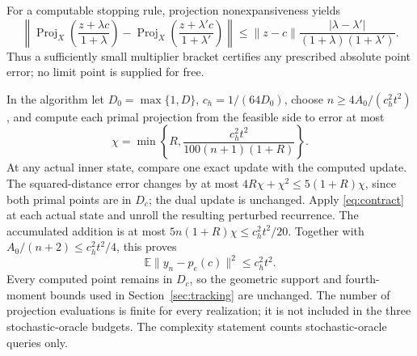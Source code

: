 \documentclass[11pt,a4paper]{article}
\newcommand{\E}{\mathbb E}
\DeclareMathOperator{\Proj}{Proj}
\theoremstyle{remark}
\numberwithin{equation}{section}
\begin{document}
For a computable stopping rule, projection nonexpansiveness yields
\[
 \left\|\Proj_X\left(\frac{z+\lambda c}{1+\lambda}\right)
 -\Proj_X\left(\frac{z+\lambda'c}{1+\lambda'}\right)\right\|
 \le \|z-c\|\frac{|\lambda-\lambda'|}{(1+\lambda)(1+\lambda')}.
\]
Thus a sufficiently small multiplier bracket certifies any prescribed absolute point error; no limit point is supplied for free.

In the algorithm let $D_0=\max\{1,D\}$, $c_h=1/(64D_0)$, choose $n\ge4A_0/(c_h^2t^2)$, and compute each primal projection from the feasible side to error at most
\[
 \chi=\min\left\{R,\frac{c_h^2t^2}{100(n+1)(1+R)}\right\}.
\]
At any actual inner state, compare one exact update with the computed update. The squared-distance error changes by at most $4R\chi+\chi^2\le5(1+R)\chi$, since both primal points are in $D_c$; the dual update is unchanged. Apply \eqref{eq:contract} at each actual state and unroll the resulting perturbed recurrence. The accumulated addition is at most $5n(1+R)\chi\le c_h^2t^2/20$. Together with $A_0/(n+2)\le c_h^2t^2/4$, this proves
\[
 \E\|y_n-p_e(c)\|^2\le c_h^2t^2.
\]
Every computed point remains in $D_c$, so the geometric support and fourth-moment bounds used in Section~\ref{sec:tracking} are unchanged. The number of projection evaluations is finite for every realization; it is not included in the three stochastic-oracle budgets. The complexity statement counts stochastic-oracle queries only.
\end{document}
